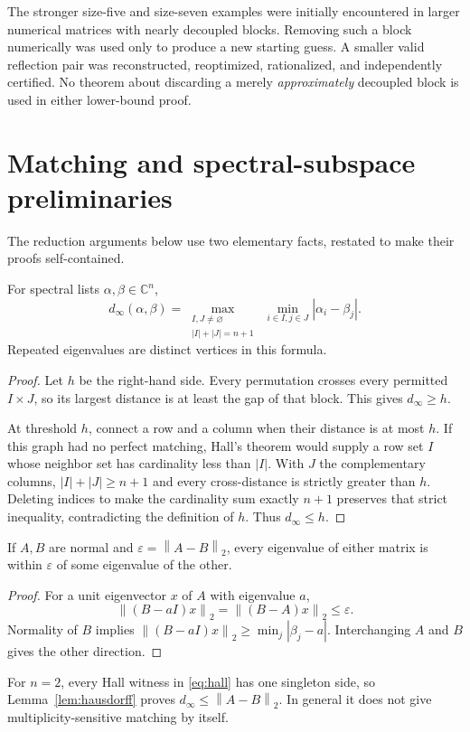 \documentclass[11pt,letterpaper]{article}
\theoremstyle{remark}\newtheorem{remark}[theorem]{Remark}
\newcommand{\C}{\mathbb C}\newcommand{\R}{\mathbb R}\newcommand{\cn}{C_{\mathrm{normal}}}\newcommand{\din}{d_{\infty}}
\newcommand{\norm}[1]{\left\lVert#1\right\rVert_2}\newcommand{\abs}[1]{\left|#1\right|}\newcommand{\diag}{\operatorname{diag}}\newcommand{\rank}{\operatorname{rank}}
\begin{document}
The stronger size-five and size-seven examples were initially encountered in larger numerical matrices with nearly decoupled blocks. Removing such a block numerically was used only to produce a new starting guess. A smaller valid reflection pair was reconstructed, reoptimized, rationalized, and independently certified. No theorem about discarding a merely \emph{approximately} decoupled block is used in either lower-bound proof.

\section{Matching and spectral-subspace preliminaries}\label{sec:prelim}
The reduction arguments below use two elementary facts, restated to make their proofs self-contained.
\begin{lemma}\label{lem:hall}
For spectral lists $\alpha,\beta\in\C^n$,
\begin{equation}\label{eq:hall}
\din(\alpha,\beta)=
\max_{\substack{I,J\ne\varnothing\\|I|+|J|=n+1}}
\ \min_{i\in I,j\in J}|\alpha_i-\beta_j|.
\end{equation}
Repeated eigenvalues are distinct vertices in this formula.
\end{lemma}
\begin{proof}
Let $h$ be the right-hand side. Every permutation crosses every permitted $I\times J$, so its largest distance is at least the gap of that block. This gives $\din\ge h$.

At threshold $h$, connect a row and a column when their distance is at most $h$. If this graph had no perfect matching, Hall's theorem would supply a row set $I$ whose neighbor set has cardinality less than $|I|$. With $J$ the complementary columns, $|I|+|J|\ge n+1$ and every cross-distance is strictly greater than $h$. Deleting indices to make the cardinality sum exactly $n+1$ preserves that strict inequality, contradicting the definition of $h$. Thus $\din\le h$.
\end{proof}

\begin{lemma}\label{lem:hausdorff}
If $A,B$ are normal and $\varepsilon=\norm{A-B}$, every eigenvalue of either matrix is within $\varepsilon$ of some eigenvalue of the other.
\end{lemma}
\begin{proof}
For a unit eigenvector $x$ of $A$ with eigenvalue $a$,
\[
\norm{(B-aI)x}=\norm{(B-A)x}\le\varepsilon.
\]
Normality of $B$ implies $\norm{(B-aI)x}\ge\min_j|\beta_j-a|$. Interchanging $A$ and $B$ gives the other direction.
\end{proof}
For $n=2$, every Hall witness in \eqref{eq:hall} has one singleton side, so Lemma~\ref{lem:hausdorff} proves $\din\le\norm{A-B}$. In general it does not give multiplicity-sensitive matching by itself.
\end{document}
